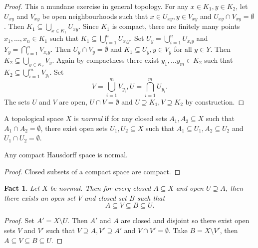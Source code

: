 \documentclass[a4paper]{article}
\newtheorem*{fact}{Fact}
\begin{document}
\begin{proof}
  This a mundane exercise in general topology. For any \(x \in K_1, y \in K_2\), let \(U_{xy}\) and \(V_{xy}\) be open neighbourhoods such that \(x \in U_{xy}, y \in V_{xy}\) and \(U_{xy} \cap V_{xy} = \emptyset\). Then \(K_1 \subseteq \bigcup_{x \in K_1} U_{xy}\). Since \(K_1\) is compact, there are finitely many points \(x_1, \dots, x_n \in K_1\) such that \(K_1 \subseteq \bigcup_{i = 1}^n U_{x_iy}\). Set \(U_y = \bigcup_{i = 1}^n U_{x_iy}\) and \(Y_y = \bigcap_{i = 1}^n V_{x_iy}\). Then \(U_y \cap V_y = \emptyset\) and \(K_1 \subseteq U_y, y \in V_y\) for all \(y \in Y\). Then \(K_2 \subseteq \bigcup_{y \in K_2} V_y\). Again by compactness there exist \(y_1, \dots y_m \in K_2\) such that \(K_2 \subseteq \bigcup_{i = 1}^m V_{y_i}\). Set
  \[
    V = \bigcup_{i = 1}^m V_{y_i}, U = \bigcap_{i = 1}^m U_{y_i}.
  \]
  The sets \(U\) and \(V\) are open, \(U \cap V = \emptyset\) and \(U \supseteq K_1, V \supseteq K_2\) by construction.
\end{proof}

\begin{definition}[normal]
  A topological space \(X\) is \emph{normal} if for any closed sets \(A_1, A_2 \subseteq X\) such that \(A_1 \cap A_2 = \emptyset\), there exist open sets \(U_1, U_2 \subseteq X\) such that \(A_1 \subseteq U_1, A_2 \subseteq U_2\) and \(U_1 \cap U_2 = \emptyset\).
\end{definition}

\begin{corollary}
  Any compact Hausdorff space is normal.
\end{corollary}

\begin{proof}
  Closed subsets of a compact space are compact.
\end{proof}

\begin{fact}
  Let \(X\) be normal. Then for every closed \(A \subseteq X\) and open \(U \supseteq A\), then there exists an open set \(V\) and closed set \(B\) such that
  \[
    A \subseteq V \subseteq B \subseteq U.
  \]
\end{fact}

\begin{proof}
  Set \(A' = X \setminus U\). Then \(A'\) and \(A\) are closed and disjoint so there exist open sets \(V\) and \(V'\) such that \(V \supseteq A, V' \supseteq A'\) and \(V \cap V' = \emptyset\). Take \(B = X \setminus V'\), then \(A \subseteq V \subseteq B \subseteq U\).
\end{proof}
\end{document}
